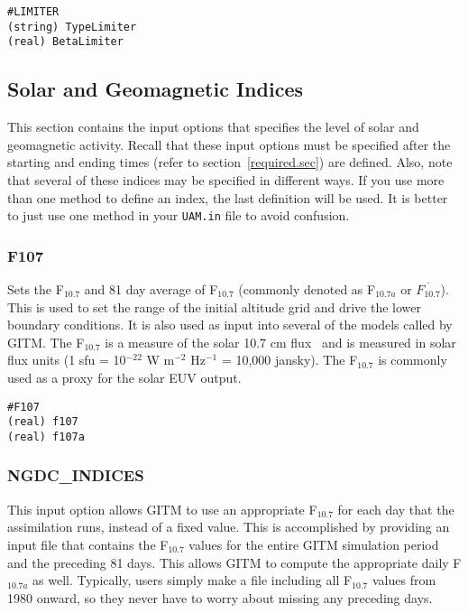 \begin{verbatim}
#LIMITER
(string) TypeLimiter
(real) BetaLimiter
\end{verbatim}

\subsection{Solar and Geomagnetic Indices}
\label{indices.sec}

This section contains the input options that specifies the level of solar and geomagnetic activity.  Recall that these input options must be specified after the starting and ending times (refer to section~\ref{required.sec}) are defined.  Also, note that several of these indices may be specified in different ways.  If you use more than one method to define an index, the last definition will be used.  It is better to just use one method in your {\tt UAM.in} file to avoid confusion.

\subsubsection{F107}
\label{f107.sec}

Sets the F$_{10.7}$ and 81 day average of F$_{10.7}$ (commonly denoted as F$_{10.7a}$ or $\overline{F_{10.7}}$).  This is used to set the range of the initial altitude grid and drive the lower boundary conditions.  It is also used as input into several of the models called by GITM.  The F$_{10.7}$ is a measure of the solar 10.7 cm flux~\citep{Covington:1948aa} and is measured in solar flux units (1 sfu = 10$^{-22}$ W m$^{-2}$ Hz$^{-1}$ = 10,000 jansky).  The F$_{10.7}$ is commonly used as a proxy for the solar EUV output.  

\begin{verbatim}
#F107
(real) f107
(real) f107a
\end{verbatim}

\subsubsection{NGDC\_INDICES}
\label{ngdc_indices.sec}

This input option allows GITM to use an appropriate F$_{10.7}$ for each day that the assimilation runs, instead of a fixed value.  This is accomplished by providing an input file that contains the F$_{10.7}$ values for the entire GITM simulation period and the preceding 81 days.  This allows GITM to compute the appropriate daily F$_{10.7a}$ as well.  Typically, users simply make a file including all F$_{10.7}$ values from 1980 onward, so they never have to worry about missing any preceding days.


